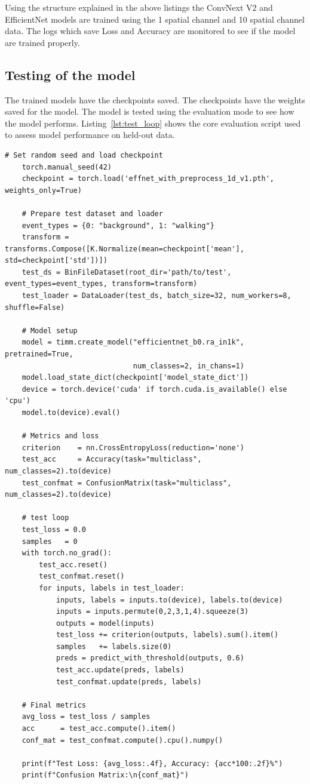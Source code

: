 Using the structure explained in the above listings the ConvNext V2 and EfficientNet models are trained using the 1 spatial channel and 10 spatial channel data. The logs which save Loss and Accuracy are monitored to see if the model are trained properly.  

\subsection{Testing of the model}
The trained models have the checkpoints saved. The checkpoints have the weights saved for the model. The model is tested using the evaluation mode to see how the model performs. Listing~\ref{lst:test_loop} shows the core evaluation script used to assess model performance on held-out data.

\begin{lstlisting}[style=pythonstyle, caption={Model test script}, label=lst:test_loop]
    # Set random seed and load checkpoint
    torch.manual_seed(42)
    checkpoint = torch.load('effnet_with_preprocess_1d_v1.pth', weights_only=True)
    
    # Prepare test dataset and loader
    event_types = {0: "background", 1: "walking"}
    transform = transforms.Compose([K.Normalize(mean=checkpoint['mean'], std=checkpoint['std'])])
    test_ds = BinFileDataset(root_dir='path/to/test', event_types=event_types, transform=transform)
    test_loader = DataLoader(test_ds, batch_size=32, num_workers=8, shuffle=False)
    
    # Model setup
    model = timm.create_model("efficientnet_b0.ra_in1k", pretrained=True,
                              num_classes=2, in_chans=1)
    model.load_state_dict(checkpoint['model_state_dict'])
    device = torch.device('cuda' if torch.cuda.is_available() else 'cpu')
    model.to(device).eval()
    
    # Metrics and loss
    criterion    = nn.CrossEntropyLoss(reduction='none')
    test_acc     = Accuracy(task="multiclass", num_classes=2).to(device)
    test_confmat = ConfusionMatrix(task="multiclass", num_classes=2).to(device)
    
    # test loop
    test_loss = 0.0
    samples   = 0
    with torch.no_grad():
        test_acc.reset()
        test_confmat.reset()
        for inputs, labels in test_loader:
            inputs, labels = inputs.to(device), labels.to(device)
            inputs = inputs.permute(0,2,3,1,4).squeeze(3)
            outputs = model(inputs)
            test_loss += criterion(outputs, labels).sum().item()
            samples   += labels.size(0)
            preds = predict_with_threshold(outputs, 0.6)
            test_acc.update(preds, labels)
            test_confmat.update(preds, labels)
    
    # Final metrics
    avg_loss = test_loss / samples
    acc      = test_acc.compute().item()
    conf_mat = test_confmat.compute().cpu().numpy()
    
    print(f"Test Loss: {avg_loss:.4f}, Accuracy: {acc*100:.2f}%")
    print(f"Confusion Matrix:\n{conf_mat}")
    \end{lstlisting}
    

